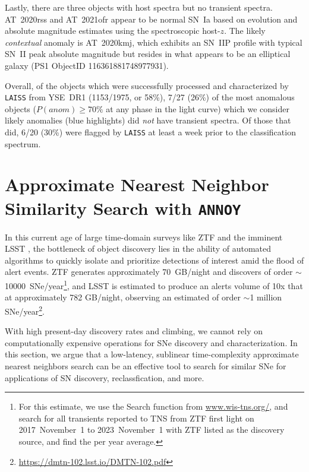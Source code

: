 \documentclass[twocolumn]{aastex63}
\newcommand{\annoy}{\texttt{ANNOY}}
\newcommand{\laiss}{\texttt{LAISS}}
\begin{document}
Lastly, there are three objects with host spectra but no transient spectra. AT~2020rss and AT~2021ofr appear to be normal SN~Ia based on evolution and absolute magnitude estimates using the spectroscopic host-$z$. The likely \emph{contextual} anomaly is AT~2020kmj, which exhibits an SN~IIP profile with typical SN~II peak absolute magnitude but resides in what appears to be an elliptical galaxy (PS1 ObjectID 116361881748977931). 

Overall, of the objects which were successfully processed and characterized by \laiss{} from YSE~DR1 (1153/1975, or 58\%), 7/27 (26\%) of the most anomalous objects ($P(anom)\geq70\%$ at any phase in the light curve) which we consider likely anomalies (blue highlights) did \emph{not} have transient spectra. Of those that did, 6/20 (30\%) were flagged by \laiss{} at least a week prior to the classification spectrum. \par

\section{Approximate Nearest Neighbor Similarity Search with \annoy{}} \label{sec:annoy}

In this current age of large time-domain surveys like ZTF \citep{Bellm2019} and the imminent LSST \citep{Ivezic2019}, the bottleneck of object discovery lies in the ability of automated algorithms to quickly isolate and prioritize detections of interest amid the flood of alert events. ZTF generates approximately 70~GB/night \citep{Patterson2019} and discovers of order $\sim$10000~SNe/year\footnote{For this estimate, we use the Search function from \url{www.wis-tns.org/}, and search for all transients reported to TNS from ZTF first light on 2017~November~1 to 2023~November~1 with ZTF listed as the discovery source, and find the per year average.}, and LSST is estimated to produce an alerts volume of 10x that at approximately 782 GB/night, observing an estimated of order $\sim$1 million SNe/year\footnote{\url{https://dmtn-102.lsst.io/DMTN-102.pdf}}. \par

With high present-day discovery rates and climbing, we cannot rely on computationally expensive operations for SNe discovery and characterization. In this section, we argue that a low-latency, sublinear time-complexity approximate nearest neighbors search can be an effective tool to search for similar SNe for applications of SN discovery, reclassfication, and more. \par
\end{document}
